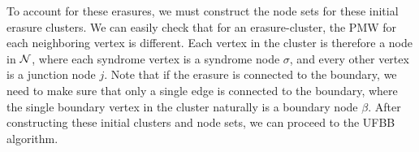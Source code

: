 To account for these erasures, we must construct the node sets for these initial erasure clusters. We can easily check that for an erasure-cluster, the PMW for each neighboring vertex is different. Each vertex in the cluster is therefore a node in $\mathcal{N}$, where each syndrome vertex is a syndrome node $\sigma$, and every other vertex is a junction node $j$. Note that if the erasure is connected to the boundary, we need to make sure that only a single edge is connected to the boundary, where the single boundary vertex in the cluster naturally is a boundary node $\beta$. After constructing these initial clusters and node sets, we can proceed to the UFBB algorithm.  